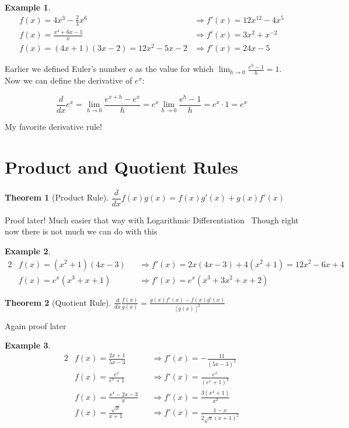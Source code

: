 \documentclass[letterpaper, 11pt, openany]{book}
\theoremstyle{mytheoremstyle}
\newtheorem{theorem}{Theorem}[section]
\theoremstyle{myexamplestyle}
\newtheorem{example}{Example}[section]
\begin{document}
\begin{example}
    \begin{align*}
        f(x) = 4x^{3} - \tfrac{2}{3}x^{6} &\Rightarrow f'(x) = 12x^{12} - 4x^{5}\\
        f(x) = \frac{x^{4} + 6x - 1}{x} &\Rightarrow f'(x) = 3x^{2} + x^{-2}\\
        f(x) = (4x+1)(3x-2) = 12x^{2} - 5x - 2 &\Rightarrow f'(x) = 24x - 5
    \end{align*}
\end{example}

Earlier we defined Euler's number e as the value for which \(\displaystyle \lim_{h \to 0} \frac{e^{h} - 1}{h} = 1\). Now we can define the derivative of \(e^{x}\):

\[\frac{d}{dx} e^{x} = \lim_{h \to 0} \frac{e^{x+h} - e^{x}}{h} = e^{x} \lim_{h \to 0} \frac{e^{h} - 1}{h} = e^{x} \cdot 1 = e^{x}\]

My favorite derivative rule! \faSmile \, \faHeart

\section{Product and Quotient Rules}

\begin{theorem}[Product Rule]\label{t:product-rule}
    \(\dfrac{d}{dx} f(x)g(x) = f(x)g'(x) + g(x)f'(x)\)
\end{theorem}
Proof later! Much easier that way with Logarithmic Differentiation \faSmile \, Though right now there is not much we can do with this \faMeh

\begin{example}
    \begin{alignat*}{2}
        &f(x) = (x^{2} + 1)(4x-3)       &&\Rightarrow f'(x) = 2x(4x-3) + 4(x^{2} + 1) = 12x^{2} -6x + 4\\
        &f(x) = e^{x}(x^{3} + x + 1)    &&\Rightarrow f'(x) = e^x \left(x^3+3 x^2+x+2\right)
    \end{alignat*}
\end{example}


\begin{theorem}[Quotient Rule]\label{t:quotient-rule}
    \(\displaystyle \frac{d}{dx} \frac{f(x)}{g(x)} = \frac{g(x)f'(x) - f(x)g'(x)}{[g(x)]^{2}}\)
\end{theorem}
Again proof later

\begin{example}
    \begin{alignat*}{2}
        &f(x) = \frac{2x+1}{5x-3} &&\Rightarrow f'(x) = -\frac{11}{(5 x-3)^2}\\
        &f(x) = \frac{e^{x}}{e^{x} + 1} &&\Rightarrow f'(x) = \frac{e^x}{\left(e^x+1\right)^2}\\
        &f(x) = \frac{x^4-2 x-3}{x} &&\Rightarrow f'(x) = \frac{3 \left(x^4+1\right)}{x^2}\\
        &f(x) = \frac{\sqrt{x}}{x + 1} &&\Rightarrow f'(x) = \frac{1-x}{2 \sqrt{x} (x+1)^2}
    \end{alignat*}
\end{example}
\end{document}
